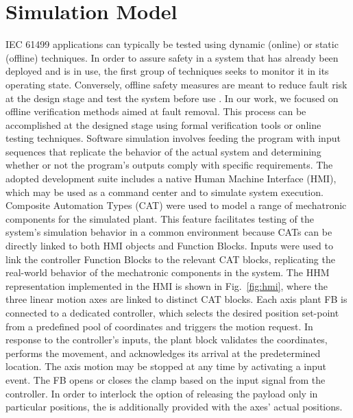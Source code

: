 \documentclass{ieeeojies}
\begin{document}
\section{Simulation Model}
\label{sec:simulation}
IEC 61499 applications can typically be tested using dynamic (online) or static (offline) techniques. In order to assure safety in a system that has already been deployed and is in use, the first group of techniques seeks to monitor it in its operating state. Conversely, offline safety measures are meant to reduce fault risk at the design stage and test the system before use \cite{Ovsiannikova2021b}.
In our work, we focused on offline verification methods aimed at fault removal. 
This process can be accomplished at the designed stage using formal verification tools or online testing techniques. 
Software simulation involves feeding the program with input sequences that replicate the behavior of the actual system and determining whether or not the program's outputs comply with specific requirements.
The adopted development suite includes a native Human Machine Interface (HMI), which may be used as a command center and to simulate system execution.
Composite Automation Types (CAT) were used to model a range of mechatronic components for the simulated plant. This feature facilitates testing of the system's simulation behavior in a common environment because CATs can be directly linked to both HMI objects and Function Blocks.
Inputs were used to link the controller Function Blocks to the relevant CAT blocks, replicating the real-world behavior of the mechatronic components in the system. The HHM representation implemented in the HMI is shown in \mbox{Fig. \ref{fig:hmi}}, where the three linear motion axes are linked to distinct CAT blocks. 
Each axis plant FB is connected to a dedicated  controller, which selects the desired position set-point from a predefined pool of coordinates and triggers the motion request. In response to the controller's inputs, the plant block validates the coordinates, performs the movement, and acknowledges its arrival at the predetermined location. The axis motion may be stopped at any time by activating a  input event.
The  FB opens or closes the clamp based on the input signal from the controller. In order to interlock the option of releasing the payload only in particular positions, the  is additionally provided with the axes' actual positions.
\end{document}
